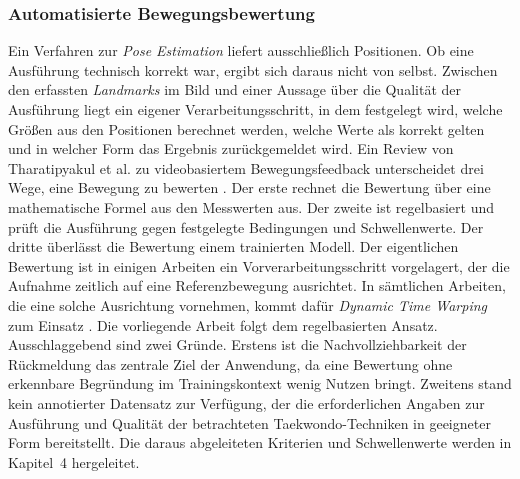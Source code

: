 \documentclass[intern]{cgMA}
\begin{document}
\subsubsection{Automatisierte Bewegungsbewertung}
Ein Verfahren zur \textit{Pose Estimation} liefert ausschließlich Positionen. Ob eine Ausführung technisch korrekt war, ergibt sich daraus nicht von selbst. Zwischen den erfassten \textit{Landmarks} im Bild und einer Aussage über die Qualität der Ausführung liegt ein eigener Verarbeitungsschritt, in dem festgelegt wird, welche Größen aus den Positionen berechnet werden, welche Werte als korrekt gelten und in welcher Form das Ergebnis zurückgemeldet wird.
Ein Review von Tharatipyakul et al. \cite{Tharatipyakul2024} zu videobasiertem Bewegungsfeedback unterscheidet drei Wege, eine Bewegung zu bewerten \cite{Tharatipyakul2024}. Der erste rechnet die Bewertung über eine mathematische Formel aus den Messwerten aus. Der zweite ist regelbasiert und prüft die Ausführung gegen festgelegte Bedingungen und Schwellenwerte. Der dritte überlässt die Bewertung einem trainierten Modell. Der eigentlichen Bewertung ist in einigen Arbeiten ein Vorverarbeitungsschritt vorgelagert, der die Aufnahme zeitlich auf eine Referenzbewegung ausrichtet. In sämtlichen Arbeiten, die eine solche Ausrichtung vornehmen, kommt dafür \textit{Dynamic Time Warping} zum Einsatz \cite{Tharatipyakul2024}.
Die vorliegende Arbeit folgt dem regelbasierten Ansatz. Ausschlaggebend sind zwei Gründe. Erstens ist die Nachvollziehbarkeit der Rückmeldung das zentrale Ziel der Anwendung, da eine Bewertung ohne erkennbare Begründung im Trainingskontext wenig Nutzen bringt. Zweitens stand kein annotierter Datensatz zur Verfügung, der die erforderlichen Angaben zur Ausführung und Qualität der betrachteten Taekwondo-Techniken in geeigneter Form bereitstellt. Die daraus abgeleiteten Kriterien und Schwellenwerte werden in Kapitel~4 hergeleitet.
\end{document}
